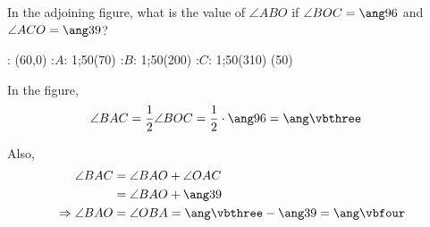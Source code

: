 


\DIVIDE{}\vbthree
\SUBTRACT\vbthree\vbtwo\vbfour

\question[2]  In the adjoining figure, what is the value of $\angle ABO$ if
$\angle BOC = \ang\vbone$ and $\angle ACO = \ang\vbtwo$?

\watchout
{}

\ifprintanswers
\fi 
\begin{marginfigure}
		: (60,0)
    :$A$: 1;50(70)
    :$B$: 1;50(200)
    :$C$: 1;50(310)
	\figdrawbegin{}
		(50)
    \figdrawline [2,3,1,4,2]
    \ifprintanswers
      \figdrawline [1,2]
    \fi
	\figdrawend
  \centerline{\box\figBoxA}
\end{marginfigure}

\begin{solution}[\halfpage]
	In the figure, 
	\begin{align}
 		\angle BAC &= \dfrac{1}{2}\angle BOC = \dfrac{1}{2}\cdot\ang\vbone = \ang\vbthree
	\end{align}
	
	Also, 
	\begin{align}
		\angle BAC &= \angle BAO + \angle OAC \\
		           &= \angle BAO + \ang\vbtwo \\
		\Rightarrow \angle BAO &= \angle OBA = \ang\vbthree - \ang\vbtwo = \ang\vbfour
	\end{align}
\end{solution}
